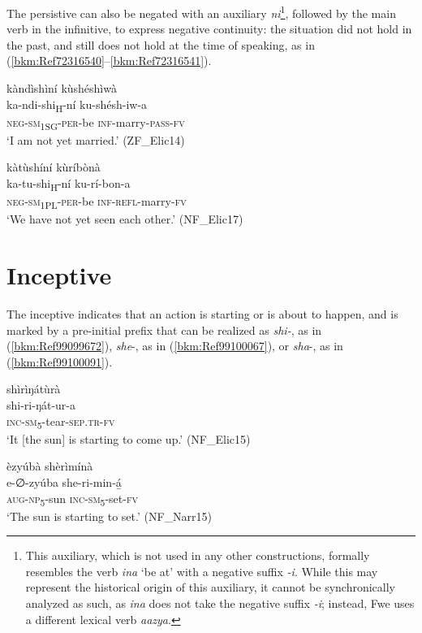 The persistive can also be negated with an auxiliary \textit{ni}\footnote{This auxiliary, which is not used in any other constructions, formally resembles the verb \textit{ina} ‘be at’ with a negative suffix \textit{-i}. While this may represent the historical origin of this auxiliary, it cannot be synchronically analyzed as such, as \textit{ina} does not take the negative suffix \textit{-i}; instead, Fwe uses a different lexical verb \textit{aazya}.}, followed by the main verb in the infinitive, to express negative continuity: the situation did not hold in the past, and still does not hold at the time of speaking, as in (\ref{bkm:Ref72316540}--\ref{bkm:Ref72316541}).

\ea
\label{bkm:Ref72316540}
kàndìshìní kùshéshìwà\\
\gll ka-ndi-shi\textsubscript{H}-ní  ku-shésh-iw-a\\
\textsc{neg}-\textsc{sm}\textsubscript{1SG}-\textsc{per}-be  \textsc{inf}-marry-\textsc{pass}-\textsc{fv}\\
\glt ‘I am not yet married.’ (ZF\_Elic14)
\z

\ea
\label{bkm:Ref72316541}
kàtùshíní kùríbònà\\
\gll ka-tu-shi\textsubscript{H}-ní  ku-rí-bon-a\\
\textsc{neg}-\textsc{sm}\textsubscript{1PL}-\textsc{per}-be  \textsc{inf}-\textsc{refl}-marry-\textsc{fv}\\
\glt ‘We have not yet seen each other.’ (NF\_Elic17)
\z
\section{Inceptive}
\label{bkm:Ref445905588}\hypertarget{Toc75352698}{}
The inceptive indicates that an action is starting or is about to happen, and is marked by a pre-initial prefix that can be realized as \textit{shi\nobreakdash-}, as in (\ref{bkm:Ref99099672}), \textit{she}-, as in (\ref{bkm:Ref99100067}), or \textit{sha}-, as in (\ref{bkm:Ref99100091}).

\ea
\label{bkm:Ref99099672}
\glll shìrìŋátùrà\\
shi-ri-ŋát-ur-a\\
\textsc{inc}-\textsc{sm}\textsubscript{5}-tear-\textsc{sep}.\textsc{tr}-\textsc{fv}\\
\glt ‘It [the sun] is starting to come up.’ (NF\_Elic15)
\z

\ea
\label{bkm:Ref99100067}
èzyúbà   shèrìmínà\\
\gll e-∅-zyúba  she-ri-min-á̲\\
\textsc{aug}-\textsc{np}\textsubscript{5}-sun  \textsc{inc}-\textsc{sm}\textsubscript{5}-set-\textsc{fv}\\
\glt ‘The sun is starting to set.’ (NF\_Narr15)
\z

